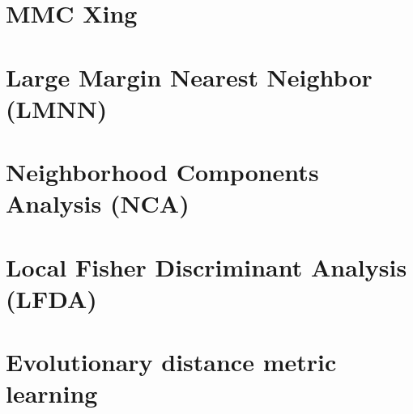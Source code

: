 \documentclass[12pt,a4paper]{report}
\begin{document}
\cite{mahalanobis1936generalized}

\section{MMC Xing} \label{chap:rw:xing}
\cite{xing2002distance}

\section{Large Margin Nearest Neighbor (LMNN)} \label{chap:rw:lmnn}
\cite{weinberger2009distance}





\section{Neighborhood Components Analysis (NCA)} \label{chap:rw:nca}
\cite{jacobgoldberger2004neighbourhood}

\section{Local Fisher Discriminant Analysis (LFDA)} \label{chap:rw:lfda}
\cite{sugiyama2007dimensionality}

\section{Evolutionary distance metric learning} \label{chap:rw:fukui}
\cite{fukui2013evolutionary}
\end{document}
